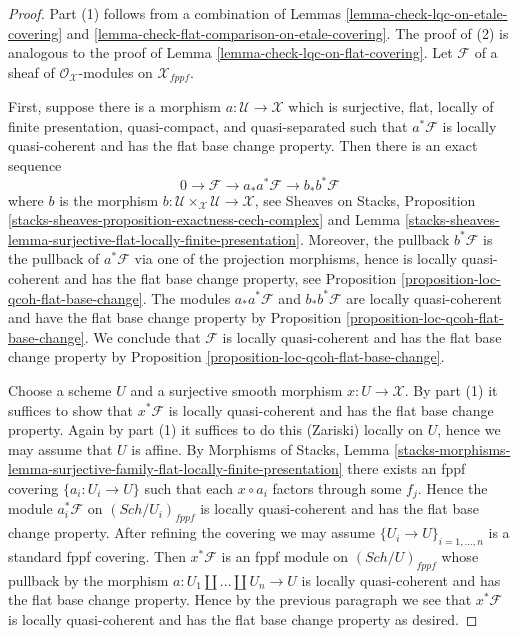 \documentclass[10pt,a4paper]{amsart}
\theoremstyle{plain}
\theoremstyle{definition}
\theoremstyle{remark}
\numberwithin{equation}{subsection}
\def\Sch{\mathit{Sch}}
\begin{document}
\begin{proof}
Part (1) follows from a combination of
Lemmas \ref{lemma-check-lqc-on-etale-covering} and
\ref{lemma-check-flat-comparison-on-etale-covering}.
The proof of (2) is analogous to the proof of
Lemma \ref{lemma-check-lqc-on-flat-covering}.
Let $\mathcal{F}$ of a sheaf of $\mathcal{O}_\mathcal{X}$-modules
on $\mathcal{X}_{fppf}$.

\medskip\noindent
First, suppose there is a morphism $a : \mathcal{U} \to \mathcal{X}$
which is surjective, flat, locally of finite presentation, quasi-compact,
and quasi-separated such that $a^*\mathcal{F}$ is locally quasi-coherent
and has the flat base change property.
Then there is an exact sequence
$$
0 \to \mathcal{F} \to a_*a^*\mathcal{F} \to b_*b^*\mathcal{F}
$$
where $b$ is the morphism
$b : \mathcal{U} \times_\mathcal{X} \mathcal{U} \to \mathcal{X}$, see
Sheaves on Stacks, Proposition
\ref{stacks-sheaves-proposition-exactness-cech-complex} and
Lemma \ref{stacks-sheaves-lemma-surjective-flat-locally-finite-presentation}.
Moreover, the pullback $b^*\mathcal{F}$ is the pullback of $a^*\mathcal{F}$
via one of the projection morphisms, hence is locally quasi-coherent
and has the flat base change property, see
Proposition \ref{proposition-loc-qcoh-flat-base-change}.
The modules $a_*a^*\mathcal{F}$ and $b_*b^*\mathcal{F}$ are locally
quasi-coherent and have the flat base change property by
Proposition \ref{proposition-loc-qcoh-flat-base-change}.
We conclude that $\mathcal{F}$ is locally quasi-coherent and
has the flat base change property by
Proposition \ref{proposition-loc-qcoh-flat-base-change}.

\medskip\noindent
Choose a scheme $U$ and a surjective smooth morphism $x : U \to \mathcal{X}$.
By part (1) it suffices to show that $x^*\mathcal{F}$ is locally
quasi-coherent and has the flat base change property.
Again by part (1) it suffices to do this (Zariski) locally on $U$,
hence we may assume that $U$ is affine. By
Morphisms of Stacks, Lemma
\ref{stacks-morphisms-lemma-surjective-family-flat-locally-finite-presentation}
there exists an fppf covering $\{a_i : U_i \to U\}$ such that
each $x \circ a_i$ factors through some $f_j$. Hence the module
$a_i^*\mathcal{F}$ on $(\Sch/U_i)_{fppf}$
is locally quasi-coherent and has the flat base change property.
After refining the covering we may assume $\{U_i \to U\}_{i = 1, \ldots, n}$
is a standard fppf covering. Then $x^*\mathcal{F}$ is an fppf
module on $(\Sch/U)_{fppf}$ whose pullback by the morphism
$a : U_1 \amalg \ldots \amalg U_n \to U$ is locally quasi-coherent
and has the flat base change property.
Hence by the previous paragraph we see that $x^*\mathcal{F}$ is locally
quasi-coherent and has the flat base change property as desired.
\end{proof}
\end{document}
